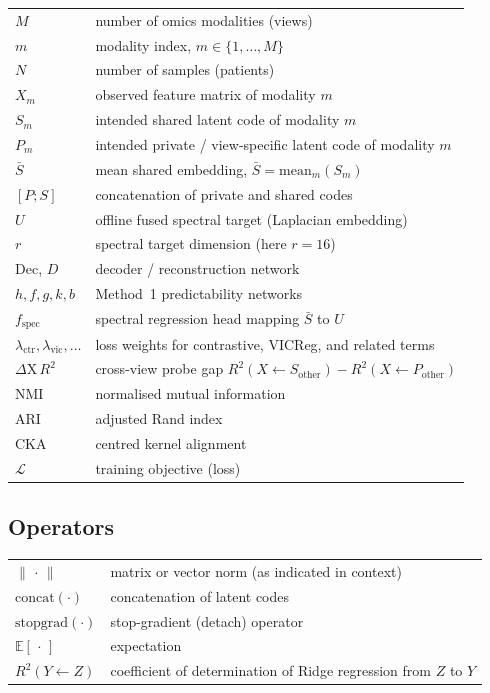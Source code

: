 \begin{tabular}{ll}
$M$ & number of omics modalities (views) \\
$m$ & modality index, $m \in \{1,\ldots,M\}$ \\
$N$ & number of samples (patients) \\
$X_m$ & observed feature matrix of modality $m$ \\
$S_m$ & intended shared latent code of modality $m$ \\
$P_m$ & intended private / view-specific latent code of modality $m$ \\
$\bar{S}$ & mean shared embedding, $\bar{S}=\mathrm{mean}_m(S_m)$ \\
$[P;S]$ & concatenation of private and shared codes \\
$U$ & offline fused spectral target (Laplacian embedding) \\
$r$ & spectral target dimension (here $r=16$) \\
$\mathrm{Dec}$, $D$ & decoder / reconstruction network \\
$h,f,g,k,b$ & Method~1 predictability networks \\
$f_{\mathrm{spec}}$ & spectral regression head mapping $\bar{S}$ to $U$ \\
$\lambda_{\mathrm{ctr}},\lambda_{\mathrm{vic}},\ldots$ & loss weights for contrastive, VICReg, and related terms \\
$\Delta\mathrm{X}\,R^{2}$ & cross-view probe gap $R^{2}(X\leftarrow S_{\mathrm{other}})-R^{2}(X\leftarrow P_{\mathrm{other}})$ \\
$\mathrm{NMI}$ & normalised mutual information \\
$\mathrm{ARI}$ & adjusted Rand index \\
$\mathrm{CKA}$ & centred kernel alignment \\
$\mathcal{L}$ & training objective (loss) \\
\end{tabular}

\subsection*{Operators}

\begin{tabular}{ll}
$\|\,\cdot\,\|$ & matrix or vector norm (as indicated in context) \\
$\mathrm{concat}(\cdot)$ & concatenation of latent codes \\
$\mathrm{stopgrad}(\cdot)$ & stop-gradient (detach) operator \\
$\mathbb{E}[\,\cdot\,]$ & expectation \\
$R^{2}(Y\leftarrow Z)$ & coefficient of determination of Ridge regression from $Z$ to $Y$ \\
\end{tabular}

